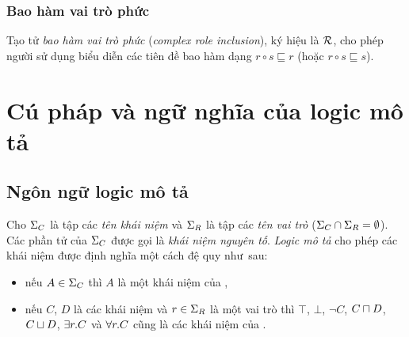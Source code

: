 \subsubsection{Bao hàm vai trò phức}
\label{sec:Chap1.RoleInclusion}
Tạo tử {\em bao hàm vai trò phức} ({\em complex role inclusion}), ký hiệu là $\mathcal{R}$, cho phép người sử dụng biểu diễn các tiên đề bao hàm dạng $r \circ s \sqsubseteq r$ (hoặc $r \circ s \sqsubseteq s$).

\section{Cú pháp và ngữ nghĩa của logic mô tả}
\label{sec:Chap1.SyntaxSemantic}
\subsection{Ngôn ngữ logic mô tả \ALC}
\label{sec:Chap1.ALCLanguage}
\begin{Definition}
\label{def:ALCSyntax}
Cho $\Sigma_C$ là tập các {\em tên khái niệm} và $\Sigma_R$ là tập các {\em tên vai trò} ($\Sigma_C \cap \Sigma_R = \emptyset$). Các phần tử của $\Sigma_C$ được gọi là {\em khái niệm nguyên tố}. {\em Logic mô tả} \ALC cho phép các khái niệm được định nghĩa một cách đệ quy như~sau:
\begin{itemize}
	\item nếu $A \in \Sigma_C$ thì $A$ là một khái niệm của \ALC,
	\item nếu $C$, $D$ là các khái niệm và $r \in \Sigma_R$ là một vai trò thì $\top$, $\bot$, $\neg C$, $C \sqcap D$, $C \sqcup D$, $\exists r.C$ và $\forall r.C$ cũng là các khái niệm của \ALC.\myend
\end{itemize}
\end{Definition}

